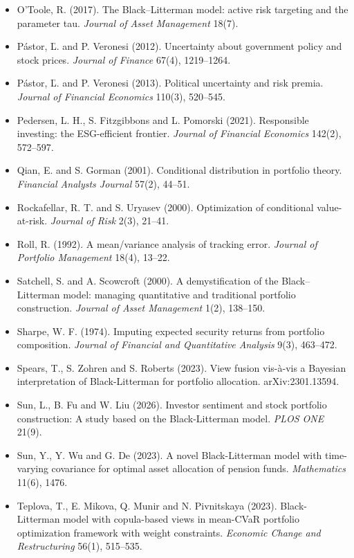 {\begin{itemize}[leftmargin=1.2em,itemsep=0.25em,label={}]
\item O'Toole, R. (2017). The Black--Litterman model: active risk targeting and the parameter tau. \textit{Journal of Asset Management} 18(7).
\item P\'astor, \v{L}. and P. Veronesi (2012). Uncertainty about government policy and stock prices. \textit{Journal of Finance} 67(4), 1219--1264.
\item P\'astor, \v{L}. and P. Veronesi (2013). Political uncertainty and risk premia. \textit{Journal of Financial Economics} 110(3), 520--545.
\item Pedersen, L. H., S. Fitzgibbons and L. Pomorski (2021). Responsible investing: the ESG-efficient frontier. \textit{Journal of Financial Economics} 142(2), 572--597.
\item Qian, E. and S. Gorman (2001). Conditional distribution in portfolio theory. \textit{Financial Analysts Journal} 57(2), 44--51.
\item Rockafellar, R. T. and S. Uryasev (2000). Optimization of conditional value-at-risk. \textit{Journal of Risk} 2(3), 21--41.
\item Roll, R. (1992). A mean/variance analysis of tracking error. \textit{Journal of Portfolio Management} 18(4), 13--22.
\item Satchell, S. and A. Scowcroft (2000). A demystification of the Black--Litterman model: managing quantitative and traditional portfolio construction. \textit{Journal of Asset Management} 1(2), 138--150.
\item Sharpe, W. F. (1974). Imputing expected security returns from portfolio composition. \textit{Journal of Financial and Quantitative Analysis} 9(3), 463--472.
\item Spears, T., S. Zohren and S. Roberts (2023). View fusion vis-\`a-vis a Bayesian interpretation of Black-Litterman for portfolio allocation. arXiv:2301.13594.
\item Sun, L., B. Fu and W. Liu (2026). Investor sentiment and stock portfolio construction: A study based on the Black-Litterman model. \textit{PLOS ONE} 21(9).
\item Sun, Y., Y. Wu and G. De (2023). A novel Black-Litterman model with time-varying covariance for optimal asset allocation of pension funds. \textit{Mathematics} 11(6), 1476.
\item Teplova, T., E. Mikova, Q. Munir and N. Pivnitskaya (2023). Black-Litterman model with copula-based views in mean-CVaR portfolio optimization framework with weight constraints. \textit{Economic Change and Restructuring} 56(1), 515--535.

\end{itemize}}
